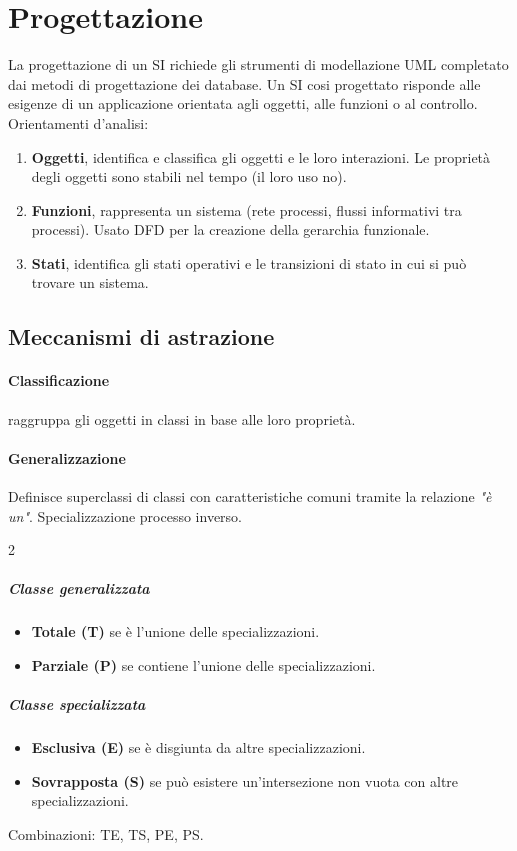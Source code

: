 \section{Progettazione}
La progettazione di un SI richiede gli strumenti di modellazione UML completato dai metodi di progettazione dei database. Un SI cosi progettato risponde alle esigenze di un applicazione orientata agli oggetti, alle funzioni o al controllo. Orientamenti d'analisi:
\begin{enumerate}
	\item \textbf{Oggetti}, identifica e classifica gli oggetti e le loro interazioni. Le proprietà degli oggetti sono stabili nel tempo (il loro uso no).
	\item \textbf{Funzioni}, rappresenta un sistema (rete processi, flussi informativi tra processi). Usato DFD per la creazione della gerarchia funzionale.
	\item \textbf{Stati}, identifica gli stati operativi e le transizioni di stato in cui si può trovare un sistema.
\end{enumerate}
\subsection{Meccanismi di astrazione}
\paragraph{Classificazione} raggruppa gli oggetti in classi in base alle loro proprietà.
\paragraph{Generalizzazione} Definisce superclassi di classi con caratteristiche comuni tramite la relazione \textit{"è un"}. Specializzazione processo inverso.
\begin{paracol}{2}
	\subparagraph{Classe generalizzata}
	\begin{itemize}
		\item \textbf{Totale (T)} se è l'unione delle specializzazioni.
		\item \textbf{Parziale (P)} se contiene l'unione delle specializzazioni.
	\end{itemize}
	\switchcolumn
	\subparagraph{Classe specializzata}
	\begin{itemize}
		\item \textbf{Esclusiva (E)} se è disgiunta da altre specializzazioni.
		\item \textbf{Sovrapposta (S)} se può esistere un'intersezione non vuota con altre specializzazioni.
	\end{itemize}
\end{paracol}
Combinazioni: TE, TS, PE, PS.

